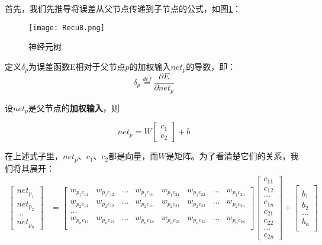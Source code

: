 首先，我们先推导将误差从父节点传递到子节点的公式，如图\ref{fig:Recu8}：

\begin{figure}[!h]
	\centering
	\texttt{[image: Recu8.png]}
	\caption{神经元树}
	\label{fig:Recu8}
\end{figure}

定义\(\delta_p\)为误差函数E相对于父节点\(p\)的加权输入\({net}_p\)的导数，即：
\[
	\delta_p\overset{def}{=}\frac{\partial{E}}{\partial{{net}_p}}
\]

设\({net}_p\)是父节点的\textbf{加权输入}，则

\[{net}_p=W\begin{bmatrix}{c}_1\\{c}_2\end{bmatrix}+{b}\]

在上述式子里，\({net}_p\)、\({c}_1\)、\({c}_2\)都是向量，而\(W\)是矩阵。为了看清楚它们的关系，我们将其展开：
\begin{align*}
	\begin{bmatrix}
		net_{p_1} \\
		net_{p_2} \\
		...       \\
		net_{p_n}
	\end{bmatrix} & =
	\begin{bmatrix}
		w_{p_1c_{11}} & w_{p_1c_{12}} & ... & w_{p_1c_{1n}} & w_{p_1c_{21}} & w_{p_1c_{22}} & ... & w_{p_1c_{2n}} \\
		w_{p_2c_{11}} & w_{p_2c_{12}} & ... & w_{p_2c_{1n}} & w_{p_2c_{21}} & w_{p_2c_{22}} & ... & w_{p_2c_{2n}} \\
		...                                                                                                       \\
		w_{p_nc_{11}} & w_{p_nc_{12}} & ... & w_{p_nc_{1n}} & w_{p_nc_{21}} & w_{p_nc_{22}} & ... & w_{p_nc_{2n}} \\
	\end{bmatrix}
	\begin{bmatrix}
		c_{11} \\
		c_{12} \\
		...    \\
		c_{1n} \\
		c_{21} \\
		c_{22} \\
		...    \\
		c_{2n}
	\end{bmatrix}+\begin{bmatrix}\\
		b_1 \\
		b_2 \\
		... \\
		b_n \\
	\end{bmatrix}
\end{align*}

